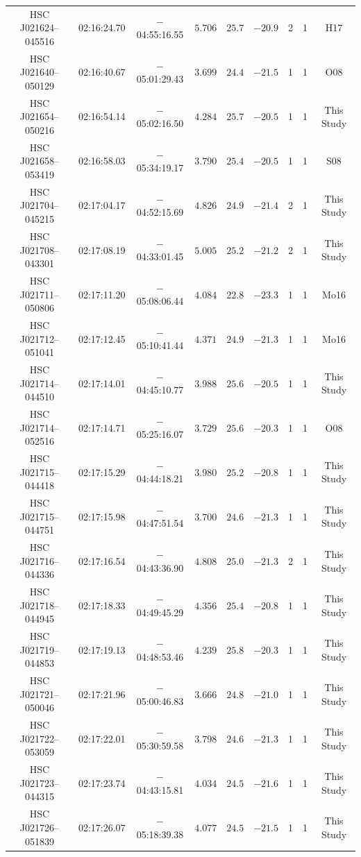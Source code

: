 \documentclass[]{pasj01}
\begin{document}
{\begin{longtable}{ccccccccc}
HSC J021624--045516 & 02:16:24.70 & $-$04:55:16.55 & $5.706$ & $25.7$ & $-20.9$ & 2 & 1 & H17 \\
HSC J021640--050129 & 02:16:40.67 & $-$05:01:29.43 & $3.699$ & $24.4$ & $-21.5$ & 1 & 1 & O08 \\
HSC J021654--050216 & 02:16:54.14 & $-$05:02:16.50 & $4.284$ & $25.7$ & $-20.5$ & 1 & 1 & This Study \\
HSC J021658--053419 & 02:16:58.03 & $-$05:34:19.17 & $3.790$ & $25.4$ & $-20.5$ & 1 & 1 & S08 \\
HSC J021704--045215 & 02:17:04.17 & $-$04:52:15.69 & $4.826$ & $24.9$ & $-21.4$ & 2 & 1 & This Study \\
HSC J021708--043301 & 02:17:08.19 & $-$04:33:01.45 & $5.005$ & $25.2$ & $-21.2$ & 2 & 1 & This Study \\
HSC J021711--050806 & 02:17:11.20 & $-$05:08:06.44 & $4.084$ & $22.8$ & $-23.3$ & 1 & 1 & Mo16 \\
HSC J021712--051041 & 02:17:12.45 & $-$05:10:41.44 & $4.371$ & $24.9$ & $-21.3$ & 1 & 1 & Mo16 \\
HSC J021714--044510 & 02:17:14.01 & $-$04:45:10.77 & $3.988$ & $25.6$ & $-20.5$ & 1 & 1 & This Study \\
HSC J021714--052516 & 02:17:14.71 & $-$05:25:16.07 & $3.729$ & $25.6$ & $-20.3$ & 1 & 1 & O08 \\
HSC J021715--044418 & 02:17:15.29 & $-$04:44:18.21 & $3.980$ & $25.2$ & $-20.8$ & 1 & 1 & This Study \\
HSC J021715--044751 & 02:17:15.98 & $-$04:47:51.54 & $3.700$ & $24.6$ & $-21.3$ & 1 & 1 & This Study \\
HSC J021716--044336 & 02:17:16.54 & $-$04:43:36.90 & $4.808$ & $25.0$ & $-21.3$ & 2 & 1 & This Study \\
HSC J021718--044945 & 02:17:18.33 & $-$04:49:45.29 & $4.356$ & $25.4$ & $-20.8$ & 1 & 1 & This Study \\
HSC J021719--044853 & 02:17:19.13 & $-$04:48:53.46 & $4.239$ & $25.8$ & $-20.3$ & 1 & 1 & This Study \\
HSC J021721--050046 & 02:17:21.96 & $-$05:00:46.83 & $3.666$ & $24.8$ & $-21.0$ & 1 & 1 & This Study \\
HSC J021722--053059 & 02:17:22.01 & $-$05:30:59.58 & $3.798$ & $24.6$ & $-21.3$ & 1 & 1 & This Study \\
HSC J021723--044315 & 02:17:23.74 & $-$04:43:15.81 & $4.034$ & $24.5$ & $-21.6$ & 1 & 1 & This Study \\
HSC J021726--051839 & 02:17:26.07 & $-$05:18:39.38 & $4.077$ & $24.5$ & $-21.5$ & 1 & 1 & This Study \\

\end{longtable}}
\end{document}

